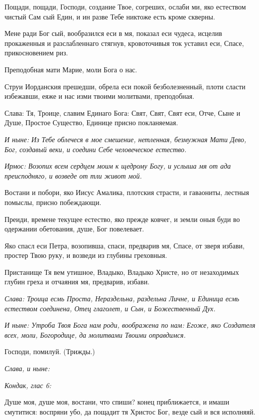 Пощади, пощади, Господи, создание Твое, согреших, ослаби ми, яко естеством чистый Сам сый Един, и ин разве Тебе никтоже есть кроме скверны. 

Мене ради Бог сый, вообразился еси в мя, показал еси чудеса, исцелив прокаженныя и разслабленнаго стягнув, кровоточивыя ток уставил еси, Спасе, прикосновением риз. 

Преподобная мати Марие, моли Бога о нас. 

Струи Иорданския прешедши, обрела еси покой безболезненный, плоти сласти избежавши, еяже и нас изми твоими молитвами, преподобная. 

Слава: Тя, Троице, славим Единаго Бога: Свят, Свят, Свят еси, Отче, Сыне и Душе, Простое Существо, Единице присно покланяемая. 

\itshape И ныне\normalfont{}: Из Тебе облечеся в мое смешение, нетленная, безмужная Мати Дево, Бог, создавый веки, и соедини Себе человеческое естество.


\itshape Ирмос\normalfont{}: Возопих всем сердцем моим к щедрому Богу, и услыша мя от ада преисподняго, и возведе от тли живот мой. 

Востани и побори, яко Иисус Амалика, плотския страсти, и гаваониты, лестныя помыслы, присно побеждающи. 

Преиди, времене текущее естество, яко прежде ковчег, и земли оныя буди во одержании обетования, душе, Бог повелевает. 

Яко спасл еси Петра, возопивша, спаси, предварив мя, Спасе, от зверя избави, простер Твою руку, и возведи из глубины греховныя. 

Пристанище Тя вем утишное, Владыко, Владыко Христе, но от незаходимых глубин греха и отчаяния мя, предварив, избави. 

\itshape Слава\normalfont{}: Троица есмь Проста, Нераздельна, раздельна Личне, и Единица есмь естеством соединена, Отец глаголет, и Сын, и Божественный Дух. 

\itshape И ныне\normalfont{}: Утроба Твоя Бога нам роди, воображена по нам: Егоже, яко Создателя всех, моли, Богородице, да молитвами Твоими оправдимся. 

Господи, помилуй. (Трижды.) 

\itshape Слава, и ныне\normalfont{}: 

\itshape Кондак, глас 6:

\normalfont{}

Душе моя, душе моя, востани, что спиши? конец приближается, и имаши смутитися: воспряни убо, да пощадит тя Христос Бог, везде сый и вся исполняяй. 

